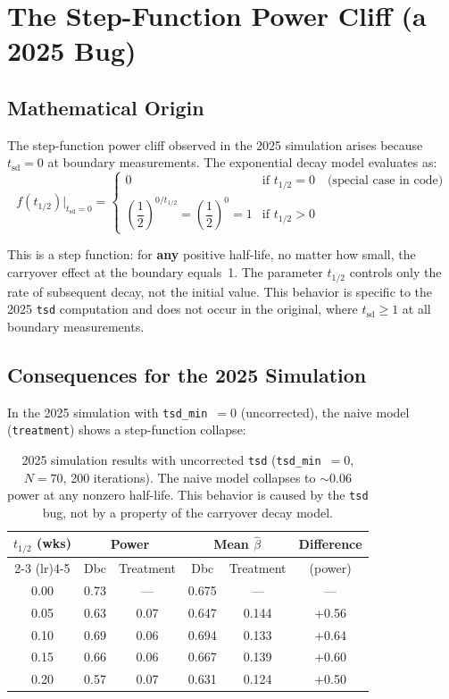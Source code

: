 \documentclass[11pt]{article}
\begin{document}
\section{The Step-Function Power Cliff (a 2025 Bug)}
\label{sec:cliff}

\subsection{Mathematical Origin}

The step-function power cliff observed in the 2025 simulation arises
because $t_{\text{sd}} = 0$ at boundary measurements. The exponential
decay model evaluates as:
\[
  f(t_{1/2}) \big|_{t_{\text{sd}}=0} =
  \begin{cases}
    0 & \text{if } t_{1/2} = 0 \quad \text{(special case in code)} \\[4pt]
    \left(\dfrac{1}{2}\right)^{0 / t_{1/2}}
      = \left(\dfrac{1}{2}\right)^{0} = 1
      & \text{if } t_{1/2} > 0
  \end{cases}
\]

This is a step function: for \textbf{any} positive half-life, no
matter how small, the carryover effect at the boundary equals~1.
The parameter $t_{1/2}$ controls only the rate of subsequent decay,
not the initial value. This behavior is specific to the 2025
\texttt{tsd} computation and does not occur in the original, where
$t_{\text{sd}} \geq 1$ at all boundary measurements.

\subsection{Consequences for the 2025 Simulation}

In the 2025 simulation with \texttt{tsd\_min}~$= 0$ (uncorrected),
the naive model (\texttt{treatment}) shows a step-function collapse:

\begin{table}[h]
\centering
\caption{2025 simulation results with uncorrected \texttt{tsd}
  (\texttt{tsd\_min}~$= 0$, $N = 70$, 200 iterations). The naive
  model collapses to $\sim$0.06 power at any nonzero half-life.
  This behavior is caused by the \texttt{tsd} bug, not by a property
  of the carryover decay model.}
\label{tab:uncorrected}
\begin{tabular}{@{}cccccc@{}}
\toprule
$t_{1/2}$ (wks) & \multicolumn{2}{c}{Power} &
  \multicolumn{2}{c}{Mean $\hat{\beta}$} & Difference \\
\cmidrule(lr){2-3} \cmidrule(lr){4-5}
  & Dbc & Treatment & Dbc & Treatment & (power) \\
\midrule
0.00 & 0.73 & ---  & 0.675 & ---   & ---    \\
0.05 & 0.63 & 0.07 & 0.647 & 0.144 & +0.56  \\
0.10 & 0.69 & 0.06 & 0.694 & 0.133 & +0.64  \\
0.15 & 0.66 & 0.06 & 0.667 & 0.139 & +0.60  \\
0.20 & 0.57 & 0.07 & 0.631 & 0.124 & +0.50  \\
\bottomrule
\end{tabular}
\end{table}
\end{document}
